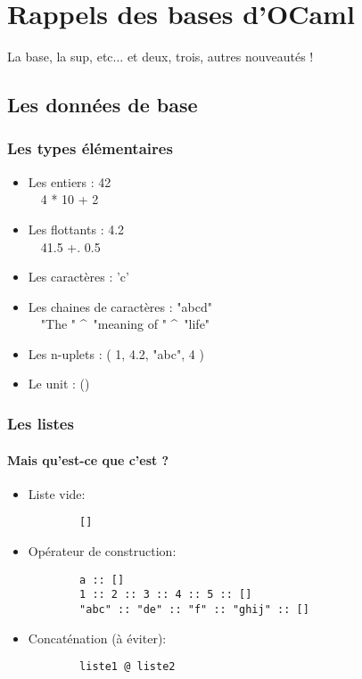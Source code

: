\section{Rappels des bases d'OCaml}
\begin{frame}
  \begin{center}
	\huge
	La base, la sup, etc... et deux, trois, autres nouveautés !
  \end{center}
\end{frame}

\subsection{Les données de base} %
\begin{frame}[fragile]
	\frametitle{Les types élémentaires}
	\begin{itemize}
		\item Les entiers : 42\\
			~~4 * 10 + 2
		\item Les flottants : 4.2\\
			~~41.5 +. 0.5
		\item Les caractères : 'c'\\
		\item Les chaines de caractères : "abcd"\\
			~~"The " \^~"meaning of " \^~"life"
			\item Les n-uplets : ( 1, 4.2, "abc", 4 )
		\item Le unit : ()
	\end{itemize}
\end{frame}

\begin{frame}[fragile]
	\frametitle{Les listes}
	\framesubtitle{Mais qu'est-ce que c'est ?}
	\begin{itemize}

	\item Liste vide:
		\begin{lstlisting}
		[]
		\end{lstlisting}

	\item Opérateur de construction:
		\begin{lstlisting}
		a :: []
		1 :: 2 :: 3 :: 4 :: 5 :: []
		"abc" :: "de" :: "f" :: "ghij" :: []
		\end{lstlisting}

	\item Concaténation (à éviter):
		\begin{lstlisting}
		liste1 @ liste2
		\end{lstlisting}

	\end{itemize}
\end{frame}

